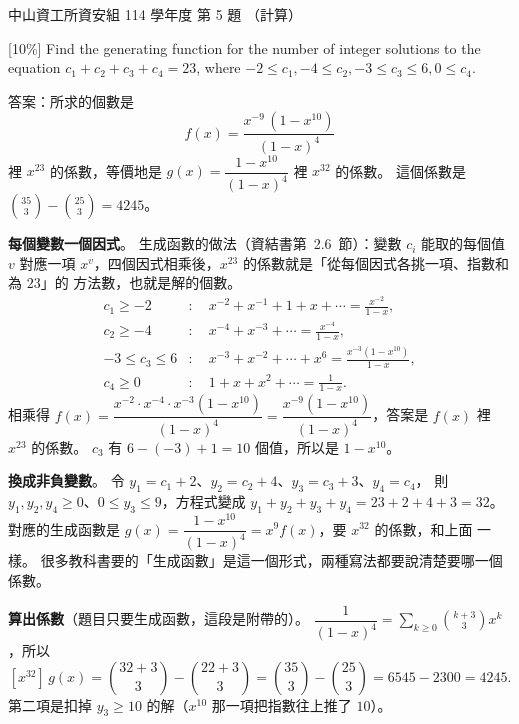 \begin{pastexam}[label={px:nsysu-114-dmalg-04}]{中山資工所資安組 114 學年度 第 5 題}
（計算）

{[10\%]} Find the generating function for the number of integer solutions to the equation
$c_1 + c_2 + c_3 + c_4 = 23$, where $-2 \le c_1, -4 \le c_2, -3 \le c_3 \le 6, 0 \le c_4$.
\end{pastexam}

\begin{pastsoln}
答案：所求的個數是
\[
f(x) = \frac{x^{-9}\,(1 - x^{10})}{(1 - x)^4}
\]
裡 $x^{23}$ 的係數，等價地是 $g(x) = \dfrac{1 - x^{10}}{(1 - x)^4}$ 裡 $x^{32}$ 的係數。 這個係數是
$\binom{35}{3} - \binom{25}{3} = 4245$。

\textbf{每個變數一個因式}。 生成函數的做法（資結書第~2.6~節）：變數 $c_i$ 能取的每個值 $v$
對應一項 $x^v$，四個因式相乘後，$x^{23}$ 的係數就是「從每個因式各挑一項、指數和為 $23$」的
方法數，也就是解的個數。
\begin{align*}
c_1 \ge -2 &:\quad x^{-2} + x^{-1} + 1 + x + \cdots = \frac{x^{-2}}{1 - x}, \\
c_2 \ge -4 &:\quad x^{-4} + x^{-3} + \cdots = \frac{x^{-4}}{1 - x}, \\
-3 \le c_3 \le 6 &:\quad x^{-3} + x^{-2} + \cdots + x^{6} = \frac{x^{-3}(1 - x^{10})}{1 - x}, \\
c_4 \ge 0 &:\quad 1 + x + x^2 + \cdots = \frac{1}{1 - x}.
\end{align*}
相乘得 $f(x) = \dfrac{x^{-2} \cdot x^{-4} \cdot x^{-3}(1 - x^{10})}{(1-x)^4}
= \dfrac{x^{-9}(1 - x^{10})}{(1 - x)^4}$，答案是 $f(x)$ 裡 $x^{23}$ 的係數。 $c_3$ 有 $6 - (-3) + 1 = 10$
個值，所以是 $1 - x^{10}$。

\textbf{換成非負變數}。 令 $y_1 = c_1 + 2$、$y_2 = c_2 + 4$、$y_3 = c_3 + 3$、$y_4 = c_4$，
則 $y_1, y_2, y_4 \ge 0$、$0 \le y_3 \le 9$，方程式變成 $y_1 + y_2 + y_3 + y_4 = 23 + 2 + 4 + 3 = 32$。
對應的生成函數是 $g(x) = \dfrac{1 - x^{10}}{(1 - x)^4} = x^{9} f(x)$，要 $x^{32}$ 的係數，和上面
一樣。 很多教科書要的「生成函數」是這一個形式，兩種寫法都要說清楚要哪一個係數。

\textbf{算出係數}（題目只要生成函數，這段是附帶的）。 $\dfrac{1}{(1-x)^4} = \sum_{k \ge 0}
\binom{k + 3}{3} x^k$，所以
\[
[x^{32}]\, g(x) = \binom{32 + 3}{3} - \binom{22 + 3}{3} = \binom{35}{3} - \binom{25}{3}
= 6545 - 2300 = 4245 .
\]
第二項是扣掉 $y_3 \ge 10$ 的解（$x^{10}$ 那一項把指數往上推了 $10$）。
\end{pastsoln}
